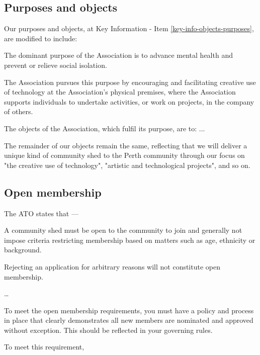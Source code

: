 \documentclass[../constitution.tex]{subfiles}
\begin{document}
\subsection*{Purposes and objects}

Our purposes and objects, at Key Information - Item \ref{key-info-objects-purposes}, are modified to include:

\begin{displayquote}
The dominant purpose of the Association is to advance mental health and prevent or relieve social isolation.

The Association pursues this purpose by encouraging and facilitating creative use of technology at the Association's physical premises, where the Association supports individuals to undertake activities, or work on projects, in the company of others.
  
The objects of the Association, which fulfil its purpose, are to: ...
\end{displayquote}

The remainder of our objects remain the same, reflecting that we will deliver a unique kind of community shed to the Perth community through our focus on "the creative use of technology", "artistic and technological projects", and so on.

\subsection*{Open membership}

The ATO states that ---

\begin{displayquote}

    A community shed must be open to the community to join and generally not impose criteria restricting membership based on matters such as age, ethnicity or background.

    Rejecting an application for arbitrary reasons will not constitute open membership.

    \dots

    To meet the open membership requirements, you must have a policy and process in place that clearly demonstrates all new members are nominated and approved without exception. This should be reflected in your governing rules.

\end{displayquote}

\bigskip

To meet this requirement,
\end{document}
